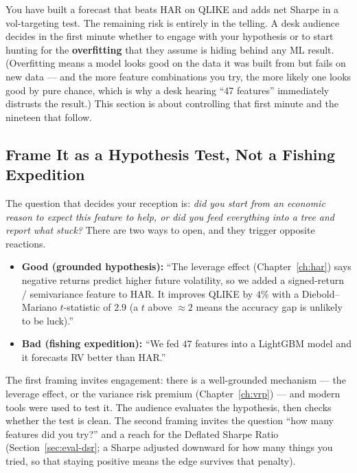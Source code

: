 You have built a forecast that beats HAR on QLIKE and adds net Sharpe in a vol-targeting test. The remaining risk is entirely in the telling. A desk audience decides in the first minute whether to engage with your hypothesis or to start hunting for the \textbf{overfitting} that they assume is hiding behind any ML result. (Overfitting means a model looks good on the data it was built from but fails on new data --- and the more feature combinations you try, the more likely one looks good by pure chance, which is why a desk hearing ``47 features'' immediately distrusts the result.) This section is about controlling that first minute and the nineteen that follow.

\subsection{Frame It as a Hypothesis Test, Not a Fishing Expedition}
\label{subsec:framing}

The question that decides your reception is: \emph{did you start from an economic reason to expect this feature to help, or did you feed everything into a tree and report what stuck?} There are two ways to open, and they trigger opposite reactions.

\begin{itemize}[leftmargin=1.5em]
  \item \textbf{Good (grounded hypothesis):} ``The leverage effect (Chapter~\ref{ch:har}) says negative returns predict higher future volatility, so we added a signed-return / semivariance feature to HAR. It improves QLIKE by $4\%$ with a Diebold--Mariano $t$-statistic of $2.9$ (a $t$ above $\approx 2$ means the accuracy gap is unlikely to be luck).''
  \item \textbf{Bad (fishing expedition):} ``We fed $47$ features into a LightGBM model and it forecasts RV better than HAR.''
\end{itemize}

The first framing invites engagement: there is a well-grounded mechanism --- the leverage effect, or the variance risk premium (Chapter~\ref{ch:vrp}) --- and modern tools were used to test it. The audience evaluates the hypothesis, then checks whether the test is clean. The second framing invites the question ``how many features did you try?'' and a reach for the Deflated Sharpe Ratio (Section~\ref{sec:eval-dsr}; a Sharpe adjusted downward for how many things you tried, so that staying positive means the edge survives that penalty).

